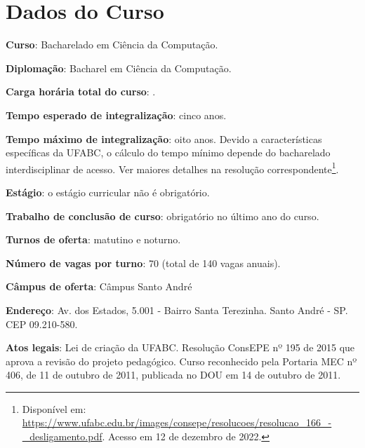 \section{Dados do Curso}
\label{sec:dados_curso}

\textbf{Curso}: Bacharelado em Ciência da Computação.

\textbf{Diplomação}: Bacharel em Ciência da Computação.

\textbf{Carga horária total do curso}: .

\textbf{Tempo esperado de integralização}: cinco anos.  

\textbf{Tempo máximo de integralização}: oito anos. Devido a características
específicas da UFABC, o cálculo do tempo mínimo depende do bacharelado
interdisciplinar de acesso. Ver maiores detalhes na resolução
correspondente\footnote{Disponível em:
\url{https://www.ufabc.edu.br/images/consepe/resolucoes/resolucao_166_-_desligamento.pdf}.
Acesso em 12 de dezembro de 2022.}.

\textbf{Estágio}: o estágio curricular não é obrigatório.

\textbf{Trabalho de conclusão de curso}: obrigatório no último ano do curso.

\textbf{Turnos de oferta}: matutino e noturno.

\textbf{Número de vagas por turno}: 70 (total de 140 vagas anuais).

\textbf{Câmpus de oferta}: Câmpus Santo André

\textbf{Endereço}: Av. dos Estados, 5.001 - Bairro Santa Terezinha. Santo André
- SP. CEP 09.210-580.

\textbf{Atos legais}: Lei de criação da UFABC. Resolução ConsEPE nº 195 de 2015
que aprova a revisão do projeto pedagógico. Curso reconhecido pela Portaria MEC
nº 406, de 11 de outubro de 2011, publicada no DOU em 14 de outubro de 2011.

